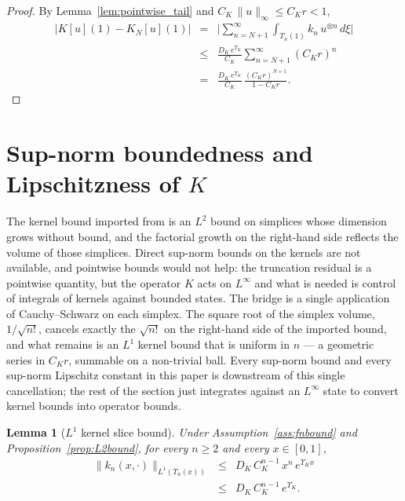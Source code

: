 \documentclass[amsthm]{autart}
\theoremstyle{plain}
\newtheorem{lemma}{Lemma}
\theoremstyle{definition}
\newcommand{\Linf}{L^\infty}
\begin{document}
\begin{proof}
By Lemma~\ref{lem:pointwise_tail} and $C_K\,\|u\|_\infty \le C_K r < 1$,
\begin{eqnarray}
\bigl|K[u](1) - K_N[u](1)\bigr| &=& \biggl|\sum_{n=N+1}^\infty \int_{T_n(1)} k_n\, u^{\otimes n}\, d\xi\biggr| \nonumber\\
&\le & \frac{D_K\, e^{\Upsilon_K}}{C_K} \sum_{n=N+1}^\infty (C_K r)^n \nonumber\\
&=& \frac{D_K\, e^{\Upsilon_K}}{C_K}\,\frac{(C_K r)^{N+1}}{1 - C_K r}.
\label{eq:tail_proof}
\end{eqnarray}
\end{proof}

\section{Sup-norm boundedness and Lipschitzness of $K$}\label{sec:KLip}

The kernel bound imported from \cite{krstic2026feedbacklinearizationhyperbolicpdes} is an $L^2$ bound on simplices whose dimension grows without bound, and the factorial growth on the right-hand side reflects the volume of those simplices. Direct sup-norm bounds on the kernels are not available, and pointwise bounds would not help: the truncation residual is a pointwise quantity, but the operator $K$ acts on $\Linf$ and what is needed is control of integrals of kernels against bounded states. The bridge is a single application of Cauchy--Schwarz on each simplex. The square root of the simplex volume, $1/\sqrt{n!}$, cancels exactly the $\sqrt{n!}$ on the right-hand side of the imported bound, and what remains is an $L^1$ kernel bound that is uniform in $n$ --- a geometric series in $C_K r$, summable on a non-trivial ball. Every sup-norm bound and every sup-norm Lipschitz constant in this paper is downstream of this single cancellation; the rest of the section just integrates against an $\Linf$ state to convert kernel bounds into operator bounds.

\begin{lemma}[$L^1$ kernel slice bound]\label{lem:knL1}
Under Assumption~\ref{ass:fnbound} and Proposition~\ref{prop:L2bound}, for every $n \ge 2$ and every $x \in [0,1]$,
\begin{eqnarray}
\|k_n(x,\cdot)\|_{L^1(T_n(x))} &\le& D_K\, C_K^{n-1}\, x^n\, e^{\Upsilon_K x} \nonumber \\
&\le& D_K\, C_K^{n-1}\, e^{\Upsilon_K}.
\label{eq:knL1}
\end{eqnarray}
\end{lemma}
\end{document}
